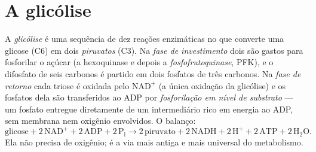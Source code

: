 \section{A glicólise}

\begin{definition}[Glicólise]\label{def:b1:respiration-fermentation:glycolysis}
A \emph{glicólise} é uma sequência de dez reações enzimáticas no 
que converte uma glicose (C6) em dois \emph{piruvatos} (C3). Na
\emph{fase de investimento} dois  são gastos para fosforilar o
açúcar (a hexoquinase e depois a \emph{fosfofrutoquinase}, PFK), e o
difosfato de seis carbonos é partido em dois fosfatos de três carbonos.
Na \emph{fase de retorno} cada triose é oxidada pelo $\mathrm{NAD^+}$ (a
única oxidação da glicólise) e os fosfatos dela são transferidos ao ADP
por \emph{fosforilação em nível de substrato}
--- um fosfato entregue diretamente de um intermediário rico em energia
ao ADP, sem membrana nem oxigênio envolvidos. O balanço:
\[
\text{glicose} + 2\,\mathrm{NAD^+} + 2\,\mathrm{ADP} + 2\,\mathrm{P_i}
\to 2\,\text{piruvato} + 2\,\mathrm{NADH} + 2\,\mathrm{H^+} + 2\,\mathrm{ATP} + 2\,\mathrm{H_2O} .
\]
Ela não precisa de oxigênio; é a via mais antiga e mais universal do
metabolismo.
\end{definition}

